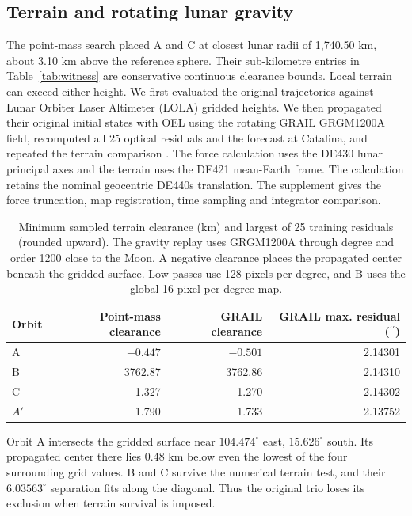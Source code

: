 \documentclass[10pt,letterpaper]{article}
\newcommand{\degc}{^{\circ}}
\newcommand{\as}{^{\prime\prime}}
\begin{document}
\subsection{Terrain and rotating lunar gravity}\label{sec:lunar}
The point-mass search placed A and C at closest lunar radii of 1,740.50 km, about 3.10 km above the reference sphere. Their sub-kilometre entries in Table~\ref{tab:witness} are conservative continuous clearance bounds. Local terrain can exceed either height. We first evaluated the original trajectories against Lunar Orbiter Laser Altimeter (LOLA) gridded heights. We then propagated their original initial states with OEL using the rotating GRAIL GRGM1200A field, recomputed all 25 optical residuals and the forecast at Catalina, and repeated the terrain comparison \cite{lola,grail}. The force calculation uses the DE430 lunar principal axes and the terrain uses the DE421 mean-Earth frame. The calculation retains the nominal geocentric DE440s translation. The supplement gives the force truncation, map registration, time sampling and integrator comparison.

\begin{table}[htbp]
\centering
\caption{Minimum sampled terrain clearance (km) and largest of 25 training residuals (rounded upward). The gravity replay uses GRGM1200A through degree and order 1200 close to the Moon. A negative clearance places the propagated center beneath the gridded surface. Low passes use 128 pixels per degree, and B uses the global 16-pixel-per-degree map.}
\label{tab:terrain}
\begin{tabular}{lrrr}
\toprule
Orbit & Point-mass clearance & GRAIL clearance & GRAIL max. residual ($\as$)\\
\midrule
A & $-0.447$ & $-0.501$ & 2.14301\\
B & 3762.87 & 3762.86 & 2.14310\\
C & 1.327 & 1.270 & 2.14302\\
$A'$ & 1.790 & 1.733 & 2.13752\\
\bottomrule
\end{tabular}
\end{table}

Orbit A intersects the gridded surface near $104.474\degc$ east, $15.626\degc$ south. Its propagated center there lies 0.48 km below even the lowest of the four surrounding grid values. B and C survive the numerical terrain test, and their $6.03563\degc$ separation fits along the diagonal. Thus the original trio loses its exclusion when terrain survival is imposed.
\end{document}
